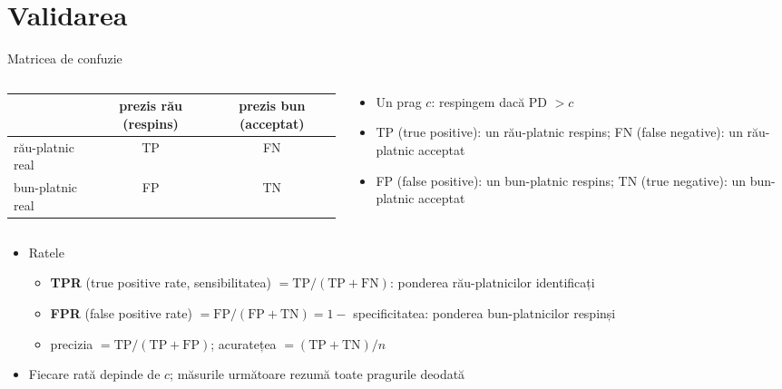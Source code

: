 \section{Validarea}

\begin{frame}{Matricea de confuzie}
\itemsize{\footnotesize}
\begin{columns}[T]
\begin{column}{0.50\textwidth}
\begin{center}
\scriptsize
\begin{tabular}{lcc}
\toprule
& prezis rău (respins) & prezis bun (acceptat) \\
\midrule
rău-platnic real & TP & FN \\
bun-platnic real & FP & TN \\
\bottomrule
\end{tabular}
\end{center}

\end{column}
\begin{column}{0.48\textwidth}
\begin{itemize}
    \item Un prag $c$: respingem dacă PD $> c$
    \item TP (true positive): un rău-platnic respins; FN (false negative): un rău-platnic acceptat
    \item FP (false positive): un bun-platnic respins; TN (true negative): un bun-platnic acceptat
\end{itemize}
\end{column}
\end{columns}\begin{itemize}
    \item Ratele
    \begin{itemize}
        \item \textbf{TPR} (true positive rate, sensibilitatea) $= \mathrm{TP}/(\mathrm{TP} + \mathrm{FN})$: ponderea rău-platnicilor identificați
        \item \textbf{FPR} (false positive rate) $= \mathrm{FP}/(\mathrm{FP} + \mathrm{TN}) = 1 -$ specificitatea: ponderea bun-platnicilor respinși
        \item precizia $= \mathrm{TP}/(\mathrm{TP} + \mathrm{FP})$; acuratețea $= (\mathrm{TP} + \mathrm{TN})/n$
    \end{itemize}
    \item Fiecare rată depinde de $c$; măsurile următoare rezumă toate pragurile deodată
\end{itemize}
\end{frame}

